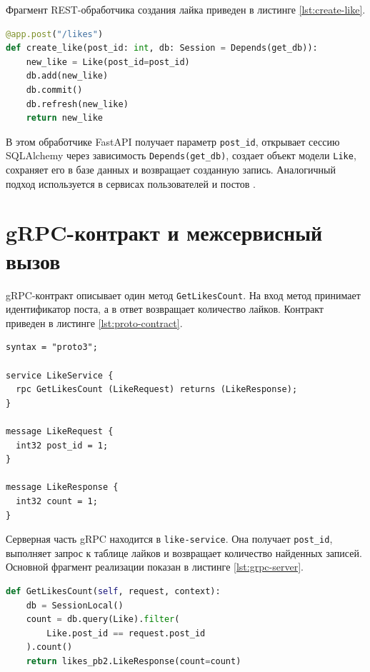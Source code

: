 Фрагмент REST-обработчика создания лайка приведен в листинге \ref{lst:create-like}.

\begin{lstlisting}[language=Python, caption={Создание лайка в like-service}, label={lst:create-like}]
@app.post("/likes")
def create_like(post_id: int, db: Session = Depends(get_db)):
    new_like = Like(post_id=post_id)
    db.add(new_like)
    db.commit()
    db.refresh(new_like)
    return new_like
\end{lstlisting}

В этом обработчике FastAPI получает параметр \texttt{post\_id}, открывает сессию SQLAlchemy
через зависимость \texttt{Depends(get\_db)}, создает объект модели \texttt{Like}, сохраняет его
в базе данных и возвращает созданную запись. Аналогичный подход используется в сервисах
пользователей и постов \cite{sqlalchemy_docs}.

\section{gRPC-контракт и межсервисный вызов}

gRPC-контракт описывает один метод \texttt{GetLikesCount}. На вход метод принимает идентификатор
поста, а в ответ возвращает количество лайков. Контракт приведен в листинге
\ref{lst:proto-contract}.

\begin{lstlisting}[caption={gRPC-контракт likes.proto}, label={lst:proto-contract}]
syntax = "proto3";

service LikeService {
  rpc GetLikesCount (LikeRequest) returns (LikeResponse);
}

message LikeRequest {
  int32 post_id = 1;
}

message LikeResponse {
  int32 count = 1;
}
\end{lstlisting}

Серверная часть gRPC находится в \texttt{like-service}. Она получает \texttt{post\_id}, выполняет
запрос к таблице лайков и возвращает количество найденных записей. Основной фрагмент реализации
показан в листинге \ref{lst:grpc-server}.

\begin{lstlisting}[language=Python, caption={Метод GetLikesCount на стороне like-service}, label={lst:grpc-server}]
def GetLikesCount(self, request, context):
    db = SessionLocal()
    count = db.query(Like).filter(
        Like.post_id == request.post_id
    ).count()
    return likes_pb2.LikeResponse(count=count)
\end{lstlisting}

